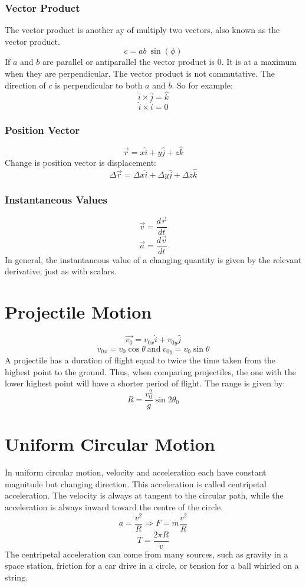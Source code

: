 \documentclass[12pt]{report}
\begin{document}
\begin{flushleft}
\subsubsection*{Vector Product}

The vector product is another ay of multiply two vectors, also known as the 
vector product.
\[c = ab\:\sin(\phi)\]
If \(a\) and \(b\) are parallel or antiparallel the vector product is \(0\).
It is at a maximum when they are perpendicular. The vector product is not 
commutative. The direction of \(c\) is perpendicular to both \(a\) and \(b\).
So for example:
\[\hat{i} \times \hat{j} = \hat{k}\]
\[\hat{i} \times \hat{i} = 0\]

\subsubsection*{Position Vector}
\[\vec{r} = x\hat{i} + y\hat{j} +z\hat{k}\]
Change is position vector is displacement:
\[\Delta\vec{r} = \Delta x \hat{i} + \Delta y \hat{j} + \Delta z \hat{k}\]

\subsubsection*{Instantaneous Values}
\[\vec{v} = \frac{d\vec{r}}{dt}\]
\[\vec{a} = \frac{d\vec{v}}{dt}\]
In general, the instantaneous value of a changing quantity is given by the 
relevant derivative, just as with scalars.

\section*{Projectile Motion}
\[\vec{v_0} = v_{0x}\hat{i} + v_{0y}\hat{j}\]
\[v_{0x} = v_0\cos{\theta} \:\mathrm{and}\: v_{0y} = v_0\sin{\theta}\]
A projectile has a duration of flight equal to twice the time taken from the 
highest point to the ground. Thus, when comparing projectiles, the one with the
lower highest point will have a shorter period of flight. The range is given 
by:
\[R = \frac{v^2_0}{g}\sin 2 \theta_0\]

\section*{Uniform Circular Motion}
In uniform circular motion, velocity and acceleration each have constant 
magnitude but changing direction. This acceleration is called centripetal 
acceleration. The velocity is always at tangent to the circular path, while 
the acceleration is always inward toward the centre of the circle.
\[a = \frac{v^2}{R} \Rightarrow F = m\frac{v^2}{R}\]
\[T = \frac{2\pi R }{v}\]
The centripetal acceleration can come from many sources, such as gravity in a 
space station, friction for a car drive in a circle, or tension for a ball 
whirled on a string.


\end{flushleft}
\end{document}
